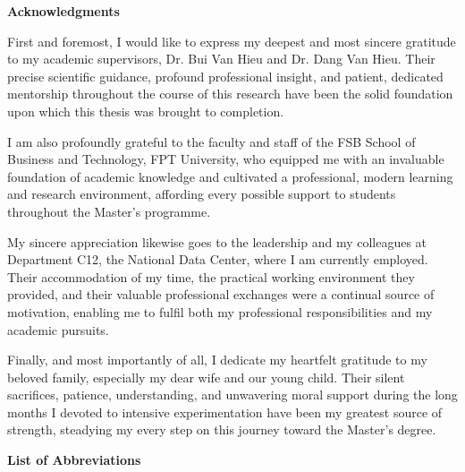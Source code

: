 \documentclass[12pt,a4paper]{report}
\begin{document}
\newpage
{}
\begin{center}
    {\Large\textbf{Acknowledgments}}
\end{center}
\vspace{0.5cm}

First and foremost, I would like to express my deepest and most sincere gratitude to my academic supervisors, Dr. Bui Van Hieu and Dr. Dang Van Hieu. Their precise scientific guidance, profound professional insight, and patient, dedicated mentorship throughout the course of this research have been the solid foundation upon which this thesis was brought to completion.

I am also profoundly grateful to the faculty and staff of the FSB School of Business and Technology, FPT University, who equipped me with an invaluable foundation of academic knowledge and cultivated a professional, modern learning and research environment, affording every possible support to students throughout the Master's programme.

My sincere appreciation likewise goes to the leadership and my colleagues at Department C12, the National Data Center, where I am currently employed. Their accommodation of my time, the practical working environment they provided, and their valuable professional exchanges were a continual source of motivation, enabling me to fulfil both my professional responsibilities and my academic pursuits.

Finally, and most importantly of all, I dedicate my heartfelt gratitude to my beloved family, especially my dear wife and our young child. Their silent sacrifices, patience, understanding, and unwavering moral support during the long months I devoted to intensive experimentation have been my greatest source of strength, steadying my every step on this journey toward the Master's degree.


\newpage
\listoffigures
\newpage
\listoftables
\newpage
{}
\begin{center}
    {\Large\textbf{List of Abbreviations}}
\end{center}
\vspace{0.5cm}
\end{document}
